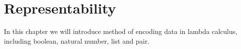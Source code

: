 \documentclass[../../../include/open-logic-chapter]{subfiles}
\begin{document}
\chapter{Representability}

In this chapter we will introduce method of encoding data in lambda
calculus, including boolean, natural number, list and pair. 


\OLEndChapterHook
\end{document}
